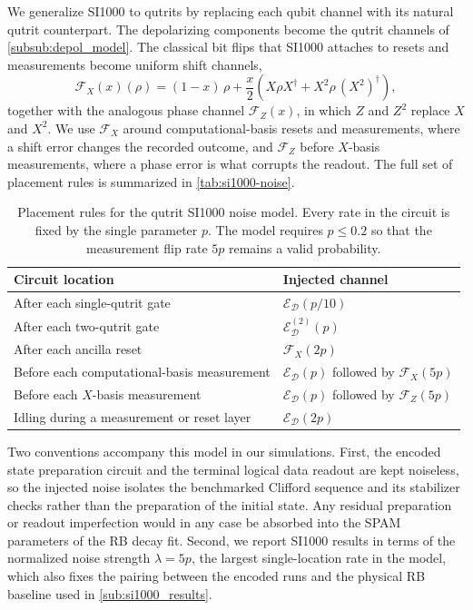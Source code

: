 We generalize SI1000 to qutrits by replacing each qubit channel with its natural qutrit counterpart. The depolarizing components become the qutrit channels of \autoref{subsub:depol_model}. The classical bit flips that SI1000 attaches to resets and measurements become uniform shift channels,
\begin{equation}
    \mathcal{F}_X(x)(\rho) = (1-x)\,\rho + \frac{x}{2}\left( X \rho X^\dagger + X^2 \rho\, (X^2)^\dagger \right),
    \label{eq:flip-channel}
\end{equation}
together with the analogous phase channel $\mathcal{F}_Z(x)$, in which $Z$ and $Z^2$ replace $X$ and $X^2$. We use $\mathcal{F}_X$ around computational-basis resets and measurements, where a shift error changes the recorded outcome, and $\mathcal{F}_Z$ before $X$-basis measurements, where a phase error is what corrupts the readout. The full set of placement rules is summarized in \autoref{tab:si1000-noise}.

\begin{table}[H]
  \centering
  \begin{tabular}{l|l}
    \hline
    Circuit location & Injected channel \\
    \hline
    After each single-qutrit gate & $\mathcal{E}_{\mathcal{D}}(p/10)$ \\
    After each two-qutrit gate & $\mathcal{E}^{(2)}_{\mathcal{D}}(p)$ \\
    After each ancilla reset & $\mathcal{F}_X(2p)$ \\
    Before each computational-basis measurement & $\mathcal{E}_{\mathcal{D}}(p)$ followed by $\mathcal{F}_X(5p)$ \\
    Before each $X$-basis measurement & $\mathcal{E}_{\mathcal{D}}(p)$ followed by $\mathcal{F}_Z(5p)$ \\
    Idling during a measurement or reset layer & $\mathcal{E}_{\mathcal{D}}(2p)$ \\
    \hline
  \end{tabular}
  \caption{Placement rules for the qutrit SI1000 noise model. Every rate in the circuit is fixed by the single parameter $p$. The model requires $p \le 0.2$ so that the measurement flip rate $5p$ remains a valid probability.}
  \label{tab:si1000-noise}
\end{table}

Two conventions accompany this model in our simulations. First, the encoded state preparation circuit and the terminal logical data readout are kept noiseless, so the injected noise isolates the benchmarked Clifford sequence and its stabilizer checks rather than the preparation of the initial state. Any residual preparation or readout imperfection would in any case be absorbed into the SPAM parameters of the RB decay fit. Second, we report SI1000 results in terms of the normalized noise strength $\lambda = 5p$, the largest single-location rate in the model, which also fixes the pairing between the encoded runs and the physical RB baseline used in \autoref{sub:si1000_results}.
